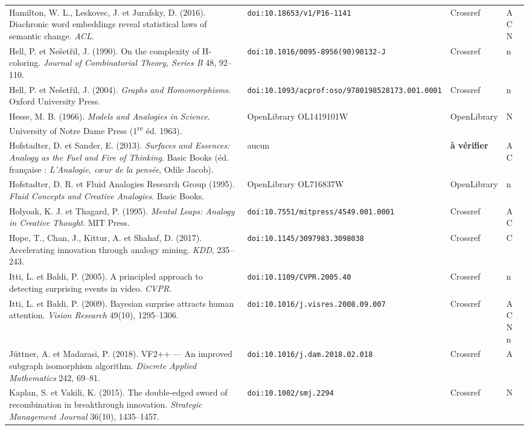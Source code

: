 \documentclass[a4paper,11pt]{article}
\begin{document}
{\begin{longtable}{@{}>{\raggedright\arraybackslash}p{8.7cm}>{\raggedright\arraybackslash}p{3.6cm}>{\raggedright\arraybackslash}p{2.1cm}>{\raggedright\arraybackslash}p{0.9cm}@{}}
Hamilton, W. L., Leskovec, J. et Jurafsky, D. (2016). Diachronic word embeddings reveal statistical laws of semantic change. \emph{ACL}. & \nolinkurl{doi:10.18653/v1/P16-1141} & Crossref & A C N\\
Hell, P. et Nešetřil, J. (1990). On the complexity of H-coloring. \emph{Journal of Combinatorial Theory, Series B} 48, 92--110. & \nolinkurl{doi:10.1016/0095-8956(90)90132-J} & Crossref & n\\
Hell, P. et Nešetřil, J. (2004). \emph{Graphs and Homomorphisms}. Oxford University Press. & \nolinkurl{doi:10.1093/acprof:oso/9780198528173.001.0001} & Crossref & n\\
Hesse, M. B. (1966). \emph{Models and Analogies in Science}. University of Notre Dame Press (1\textsuperscript{re} éd. 1963). & OpenLibrary OL1419101W & OpenLibrary & N\\
Hofstadter, D. et Sander, E. (2013). \emph{Surfaces and Essences: Analogy as the Fuel and Fire of Thinking}. Basic Books (éd. française : \emph{L'Analogie, cœur de la pensée}, Odile Jacob). & aucun & \textbf{à vérifier} & A C\\
Hofstadter, D. R. et Fluid Analogies Research Group (1995). \emph{Fluid Concepts and Creative Analogies}. Basic Books. & OpenLibrary OL716837W & OpenLibrary & n\\
Holyoak, K. J. et Thagard, P. (1995). \emph{Mental Leaps: Analogy in Creative Thought}. MIT Press. & \nolinkurl{doi:10.7551/mitpress/4549.001.0001} & Crossref & A C\\
Hope, T., Chan, J., Kittur, A. et Shahaf, D. (2017). Accelerating innovation through analogy mining. \emph{KDD}, 235--243. & \nolinkurl{doi:10.1145/3097983.3098038} & Crossref & C\\
Itti, L. et Baldi, P. (2005). A principled approach to detecting surprising events in video. \emph{CVPR}. & \nolinkurl{doi:10.1109/CVPR.2005.40} & Crossref & n\\
Itti, L. et Baldi, P. (2009). Bayesian surprise attracts human attention. \emph{Vision Research} 49(10), 1295--1306. & \nolinkurl{doi:10.1016/j.visres.2008.09.007} & Crossref & A C N n\\
Jüttner, A. et Madarasi, P. (2018). VF2++ --- An improved subgraph isomorphism algorithm. \emph{Discrete Applied Mathematics} 242, 69--81. & \nolinkurl{doi:10.1016/j.dam.2018.02.018} & Crossref & A\\
Kaplan, S. et Vakili, K. (2015). The double-edged sword of recombination in breakthrough innovation. \emph{Strategic Management Journal} 36(10), 1435--1457. & \nolinkurl{doi:10.1002/smj.2294} & Crossref & N\\

\end{longtable}}
\end{document}
